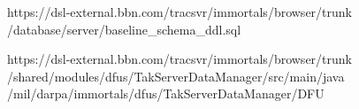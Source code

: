 

https://dsl-external.bbn.com/tracsvr/immortals/browser/trunk
   /database/server/baseline_schema_ddl.sql

https://dsl-external.bbn.com/tracsvr/immortals/browser/trunk
   /shared/modules/dfus/TakServerDataManager/src/main/java
     /mil/darpa/immortals/dfus/TakServerDataManager/DFU
